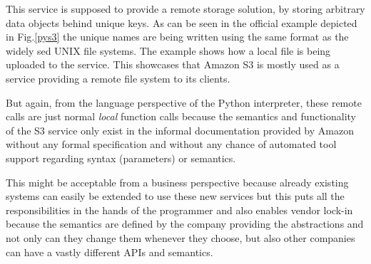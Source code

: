 This service is supposed to provide a remote storage solution,
by storing arbitrary data objects behind unique keys. As can be seen
in the official example \cite{pys3-example} depicted in Fig.\ref{pys3}
the unique names are being written using the same format as the widely
sed UNIX file systems. The example shows how a local file is being
uploaded to the service. This showcases that Amazon S3 is mostly used
as a service providing a remote file system to its clients.

But again, from the language perspective of the Python interpreter,
these remote calls are just normal \textit{local} function calls
because the semantics and functionality of the S3 service only
exist in the informal documentation provided by Amazon without any formal
specification and without any chance of automated tool support
regarding syntax (parameters) or semantics.

This might be acceptable from a business perspective because already
existing systems can easily be extended to use these new services
but this puts all the responsibilities in the hands of the programmer
and also enables vendor lock-in because the semantics are defined
by the company providing the abstractions and not only can they
change them whenever they choose, but also other companies can have
a vastly different APIs and semantics.

